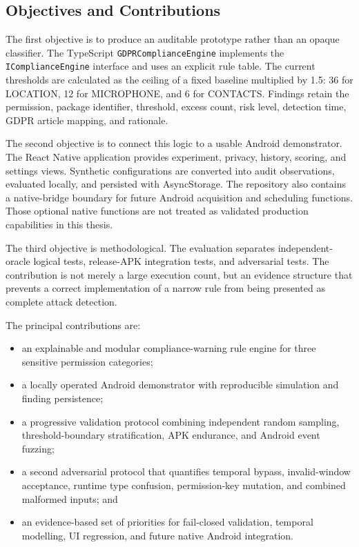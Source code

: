 \subsection{Objectives and Contributions}

The first objective is to produce an auditable prototype rather than an opaque classifier. The TypeScript \texttt{GDPRComplianceEngine} implements the \texttt{IComplianceEngine} interface and uses an explicit rule table. The current thresholds are calculated as the ceiling of a fixed baseline multiplied by 1.5: 36 for LOCATION, 12 for MICROPHONE, and 6 for CONTACTS. Findings retain the permission, package identifier, threshold, excess count, risk level, detection time, GDPR article mapping, and rationale.

The second objective is to connect this logic to a usable Android demonstrator. The React Native application provides experiment, privacy, history, scoring, and settings views. Synthetic configurations are converted into audit observations, evaluated locally, and persisted with AsyncStorage. The repository also contains a native-bridge boundary for future Android acquisition and scheduling functions. Those optional native functions are not treated as validated production capabilities in this thesis.

The third objective is methodological. The evaluation separates independent-oracle logical tests, release-APK integration tests, and adversarial tests. The contribution is not merely a large execution count, but an evidence structure that prevents a correct implementation of a narrow rule from being presented as complete attack detection.

The principal contributions are:

\begin{itemize}
    \item an explainable and modular compliance-warning rule engine for three sensitive permission categories;
    \item a locally operated Android demonstrator with reproducible simulation and finding persistence;
    \item a progressive validation protocol combining independent random sampling, threshold-boundary stratification, APK endurance, and Android event fuzzing;
    \item a second adversarial protocol that quantifies temporal bypass, invalid-window acceptance, runtime type confusion, permission-key mutation, and combined malformed inputs; and
    \item an evidence-based set of priorities for fail-closed validation, temporal modelling, UI regression, and future native Android integration.
\end{itemize}

